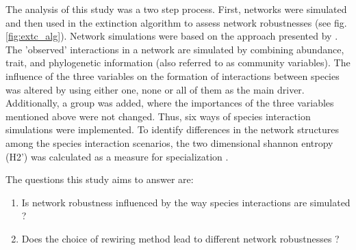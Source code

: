 \documentclass[12pt,a4paper]{article}
\begin{document}
The analysis of this study was a two step process. First, networks were simulated and then used in the extinction algorithm to assess network robustnesses (see fig. \ref{fig:extc_alg}).  
Network simulations were based on the approach presented by \citeauthor{Benadi2022} \parencite{Benadi2022}. The 'observed' interactions in a network are simulated by combining abundance, trait, and phylogenetic information (also referred to as community variables). The influence of the three variables on the formation of interactions between species was altered by using either one, none or all of them as the main driver. Additionally, a group was added, where the importances of the three variables mentioned above were not changed. Thus, six ways of species interaction simulations were implemented.
To identify differences in the network structures among the species interaction scenarios, the two dimensional shannon entropy (H2') was calculated as a measure for specialization \parencite{Bluethgen2006}.



	
The questions this study aims to answer are:
\begin{enumerate}
\item Is network robustness influenced by the way species interactions are simulated ?
\item Does the choice of rewiring method lead to different network robustnesses ?
\end{enumerate}

\end{document}
